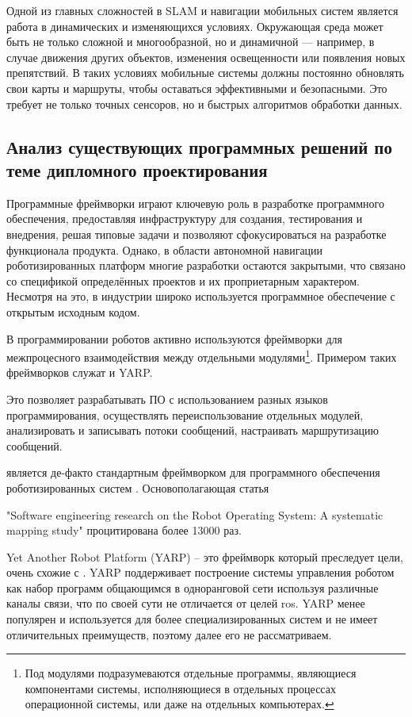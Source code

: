 Одной из главных сложностей в SLAM и навигации мобильных систем является работа
в динамических и изменяющихся условиях. Окружающая среда может быть не только
сложной и многообразной, но и динамичной — например, в случае движения других
объектов, изменения освещенности или появления новых препятствий. В таких
условиях мобильные системы должны постоянно обновлять свои карты и маршруты,
чтобы оставаться эффективными и безопасными. Это требует не только точных
сенсоров, но и быстрых алгоритмов обработки данных.

\subsection{Анализ существующих программных решений по теме дипломного
проектирования}

Программные фреймворки играют ключевую роль в разработке программного
обеспечения, предоставляя инфраструктуру для создания, тестирования и внедрения,
решая типовые задачи и позволяют сфокусироваться на разработке функционала
продукта. Однако, в области автономной навигации роботизированных платформ
многие разработки остаются закрытыми, что связано со спецификой определённых
проектов и их проприетарным характером. Несмотря на это, в индустрии широко
используется программное обеспечение с открытым исходным кодом.

В программировании роботов активно используются фреймворки для межпроцесного
взаимодействия между отдельными модулями\footnote{Под модулями подразумеваются
отдельные программы, являющиеся компонентами системы, исполняющиеся в отдельных
процессах операционной системы, или даже на отдельных компьютерах.}. Примером
таких фреймворков служат \ros{} и YARP.

Это позволяет разрабатывать ПО с использованием разных языков программирования,
осуществлять переиспользование отдельных модулей, анализировать и записывать
потоки сообщений, настраивать маршрутизацию сообщений.

\ros{} является де-факто стандартным фреймворком для программного обеспечения
роботизированных систем \cite{albonico2023software}. Основополагающая статья

"Software engineering research on the Robot Operating System: A systematic
mapping study"
\cite{quigley2009ros} процитирована более
\num{13000} раз.

Yet Another Robot Platform (YARP) \cite{metta2006yarp} -- это фреймворк который
преследует цели, очень схожие с \ros{}. YARP поддерживает построение системы
управления роботом как набор программ общающимся в одноранговой сети используя
различные каналы связи, что по своей сути не отличается от целей ros{}. YARP
менее популярен и используется для более специализированных систем и не имеет
отличительных преимуществ, поэтому далее его не рассматриваем.

